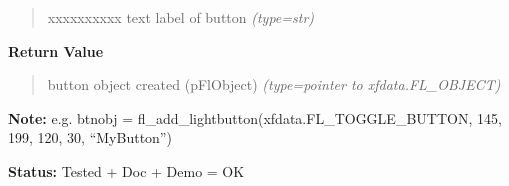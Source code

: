 \begin{boxedminipage}{\funcwidth}
\begin{quote}
\begin{Ventry}{xxxxxxxxxx}
text label of button
            {\it (type=str)}

        \end{Ventry}

      \end{quote}

      \textbf{Return Value}
    \vspace{-1ex}

      \begin{quote}

button object created (pFlObject)
      {\it (type=pointer to xfdata.FL\_OBJECT)}

      \end{quote}

\textbf{Note:} 
e.g. btnobj = fl\_add\_lightbutton(xfdata.FL\_TOGGLE\_BUTTON, 145,
199, 120, 30, ``MyButton'')


\textbf{Status:} 
Tested + Doc + Demo = OK


    \end{boxedminipage}

    \label{xformslib:flbutton:fl_add_checkbutton}

    \vspace{0.5ex}

